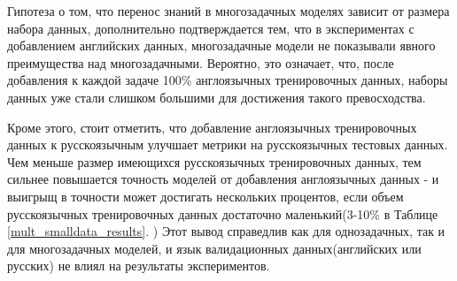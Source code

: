 Гипотеза о том, что перенос знаний в многозадачных моделях зависит от размера набора данных, дополнительно подтверждается тем, что в экспериментах с добавлением английских данных, многозадачные модели не показывали явного преимущества над многозадачными. Вероятно, это означает, что, после добавления к каждой задаче 100\% англоязычных тренировочных данных, наборы данных уже стали слишком большими для достижения такого превосходства.

Кроме этого, стоит отметить, что добавление англоязычных тренировочных данных к русскоязычным улучшает метрики на русскоязычных тестовых данных. Чем меньше размер имеющихся русскоязычных тренировочных данных, тем сильнее повышается точность моделей от добавления англоязычных данных - и выигрыщ в точности может достигать нескольких процентов, если объем русскоязычных тренировочных данных достаточно маленький(3-10\% в Таблице \ref{mult_smalldata_results}. ) Этот вывод справедлив как для однозадачных, так и для многозадачных моделей, и язык валидационных данных(английских или русских) не влиял на результаты экспериментов.
